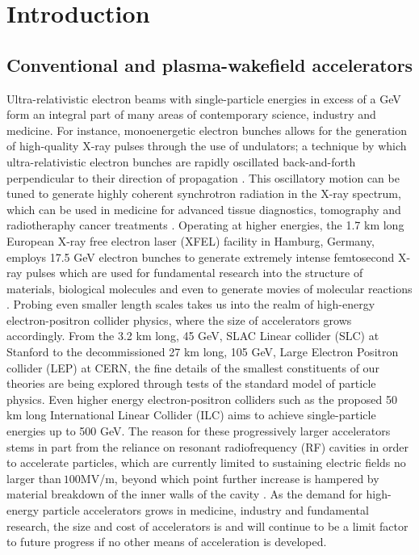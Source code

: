\chapter{Introduction}
\section{Conventional and plasma-wakefield accelerators}\vspace{-8pt}

Ultra-relativistic electron beams with single-particle energies in excess of a GeV form an integral part of many areas of contemporary science, industry and medicine. 
For instance, monoenergetic electron bunches allows for the generation of high-quality X-ray pulses through the use of undulators; a technique by which ultra-relativistic electron bunches are rapidly oscillated back-and-forth perpendicular to their direction of propagation \cite{xfel}. This oscillatory motion can be tuned to generate highly coherent synchrotron radiation in the X-ray spectrum, which can be used in medicine for advanced tissue diagnostics, tomography and radiotheraphy cancer treatments \cite{Attwood}. Operating at higher energies, the 1.7 km long European X-ray free electron laser (XFEL) facility in Hamburg, Germany, employs 17.5 GeV electron bunches to generate extremely intense femtosecond X-ray pulses which are used for fundamental research into the structure of materials, biological molecules and even to generate movies of molecular reactions \cite{xfel}. Probing even smaller length scales takes us into the realm of high-energy electron-positron collider physics, where the size of accelerators grows accordingly. From the 3.2 km long, 45 GeV, SLAC Linear collider (SLC) at Stanford to the decommissioned 27 km long, 105 GeV, Large Electron Positron collider (LEP) at CERN, the fine details of the smallest constituents of our theories are being explored through tests of the standard model of particle physics. Even higher energy electron-positron colliders such as the proposed 50 km long International Linear Collider (ILC) aims to achieve single-particle energies up to 500 GeV. The reason for these progressively larger accelerators stems in part from the reliance on resonant radiofrequency (RF) cavities in order to accelerate particles, which are currently limited to sustaining electric fields no larger than$~100$MV/m, beyond which point further increase is hampered by material breakdown of the inner walls of the cavity \cite{Insepov2008}. As the demand for high-energy particle accelerators grows in medicine, industry and fundamental research, the size and cost of accelerators is and will continue to be a limit factor to future progress if no other means of acceleration is developed.\\
